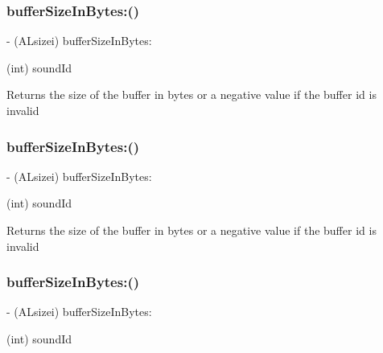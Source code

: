 \subsubsection{\texorpdfstring{buffer\+Size\+In\+Bytes\+:()}{bufferSizeInBytes:()}\hspace{0.1cm}{\footnotesize\ttfamily [2/4]}}
{\footnotesize\ttfamily -\/ (A\+Lsizei) buffer\+Size\+In\+Bytes\+: \begin{DoxyParamCaption}\item[{(int)}]{sound\+Id }\end{DoxyParamCaption}}

Returns the size of the buffer in bytes or a negative value if the buffer id is invalid \mbox{\label{interfaceCDSoundEngine_a91672bece24f10760d62cce27986573e}} 
\subsubsection{\texorpdfstring{buffer\+Size\+In\+Bytes\+:()}{bufferSizeInBytes:()}\hspace{0.1cm}{\footnotesize\ttfamily [3/4]}}
{\footnotesize\ttfamily -\/ (A\+Lsizei) buffer\+Size\+In\+Bytes\+: \begin{DoxyParamCaption}\item[{(int)}]{sound\+Id }\end{DoxyParamCaption}}

Returns the size of the buffer in bytes or a negative value if the buffer id is invalid \mbox{\label{interfaceCDSoundEngine_a91672bece24f10760d62cce27986573e}} 
\subsubsection{\texorpdfstring{buffer\+Size\+In\+Bytes\+:()}{bufferSizeInBytes:()}\hspace{0.1cm}{\footnotesize\ttfamily [4/4]}}
{\footnotesize\ttfamily -\/ (A\+Lsizei) buffer\+Size\+In\+Bytes\+: \begin{DoxyParamCaption}\item[{(int)}]{sound\+Id }\end{DoxyParamCaption}}

